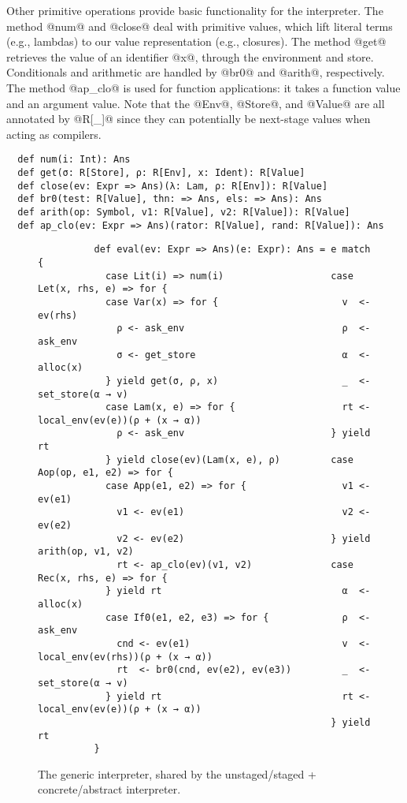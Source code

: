 Other primitive operations provide basic functionality for the
interpreter.  The method @num@ and @close@ deal with primitive values,
which lift literal terms (e.g., lambdas) to our value representation
(e.g., closures).  The method @get@ retrieves the value of an
identifier @x@, through the environment and store. Conditionals and
arithmetic are handled by @br0@ and @arith@, respectively. The method
@ap_clo@ is used for function applications: it takes a function value
and an argument value. Note that the @Env@, @Store@, and @Value@ are
all annotated by @R[_]@ since they can potentially be next-stage
values when acting as compilers.
\begin{lstlisting}
  def num(i: Int): Ans
  def get(σ: R[Store], ρ: R[Env], x: Ident): R[Value]
  def close(ev: Expr => Ans)(λ: Lam, ρ: R[Env]): R[Value]
  def br0(test: R[Value], thn: => Ans, els: => Ans): Ans
  def arith(op: Symbol, v1: R[Value], v2: R[Value]): R[Value]
  def ap_clo(ev: Expr => Ans)(rator: R[Value], rand: R[Value]): Ans
\end{lstlisting}

\begin{figure}[h!]
  \centering
  \begin{lstlisting}
          def eval(ev: Expr => Ans)(e: Expr): Ans = e match {
            case Lit(i) => num(i)                   case Let(x, rhs, e) => for {
            case Var(x) => for {                      v  <- ev(rhs)
              ρ <- ask_env                            ρ  <- ask_env
              σ <- get_store                          α  <- alloc(x)
            } yield get(σ, ρ, x)                      _  <- set_store(α → v)
            case Lam(x, e) => for {                   rt <- local_env(ev(e))(ρ + (x → α))
              ρ <- ask_env                          } yield rt
            } yield close(ev)(Lam(x, e), ρ)         case Aop(op, e1, e2) => for {
            case App(e1, e2) => for {                 v1 <- ev(e1)                                               
              v1 <- ev(e1)                            v2 <- ev(e2)
              v2 <- ev(e2)                          } yield arith(op, v1, v2)
              rt <- ap_clo(ev)(v1, v2)              case Rec(x, rhs, e) => for {
            } yield rt                                α  <- alloc(x)
            case If0(e1, e2, e3) => for {             ρ  <- ask_env
              cnd <- ev(e1)                           v  <- local_env(ev(rhs))(ρ + (x → α))
              rt  <- br0(cnd, ev(e2), ev(e3))         _  <- set_store(α → v)
            } yield rt                                rt <- local_env(ev(e))(ρ + (x → α))
                                                    } yield rt                    
          }
  \end{lstlisting}
\caption{The generic interpreter,
  shared by the unstaged/staged + concrete/abstract interpreter.}
\label{fig:shared_int}
\end{figure}
\vspace{-1em}

